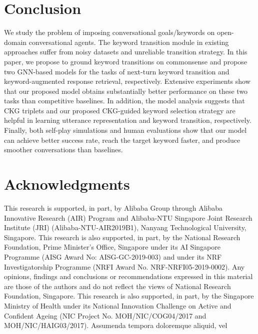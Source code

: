 \documentclass[letterpaper]{article} %
\begin{document}
\vspace{-0.96mm}
\section{Conclusion}
\label{sec: conclusion}
We study the problem of imposing conversational goals/keywords on open-domain conversational agents. The keyword transition module in existing approaches suffer from noisy datasets and unreliable transition strategy. In this paper, we propose to ground keyword transitions on commonsense and propose two GNN-based models for the tasks of next-turn keyword transition and keyword-augmented response retrieval, respectively. Extensive experiments show that our proposed model obtains substantially better performance on these two tasks than competitive baselines. In addition, the model analysis suggests that CKG triplets and our proposed CKG-guided keyword selection strategy are helpful in learning utterance representation and keyword transition, respectively. Finally, both self-play simulations and human evaluations show that our model can achieve better success rate, reach the target keyword faster, and produce smoother conversations than baselines.

\vspace{-0.93mm}
\section*{Acknowledgments}
This research is supported, in part, by Alibaba Group through Alibaba Innovative Research (AIR) Program and Alibaba-NTU Singapore Joint Research Institute (JRI) (Alibaba-NTU-AIR2019B1), Nanyang Technological University, Singapore. This research is also supported, in part, by the National Research Foundation, Prime Minister's Office, Singapore under its AI Singapore Programme (AISG Award No: AISG-GC-2019-003) and under its NRF Investigatorship Programme (NRFI Award No. NRF-NRFI05-2019-0002). Any opinions, findings and conclusions or recommendations expressed in this material are those of the authors and do not reflect the views of National Research Foundation, Singapore. This research is also supported, in part, by the Singapore Ministry of Health under its National Innovation Challenge on Active and Confident Ageing (NIC Project No. MOH/NIC/COG04/2017 and MOH/NIC/HAIG03/2017).  Assumenda tempora doloremque aliquid, vel

\end{document}
